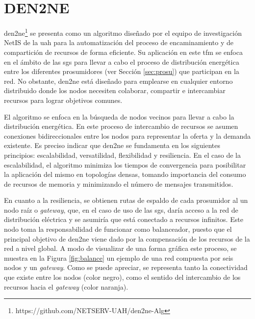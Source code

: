 \section{DEN2NE}
\label{sec:den2ne}

\acrfull{den2ne}\footnote{https://github.com/NETSERV-UAH/den2ne-Alg} \cite{den2ne} \cite{gitden2ne} se presenta como un algoritmo diseñado por el equipo de investigación NetIS de la \gls{uah} para la automatización del proceso de encaminamiento y de compartición de recursos de forma eficiente. Su aplicación en este \gls{tfm} se enfoca en el ámbito de las \gls{sg}s para llevar a cabo el proceso de distribución energética entre los diferentes prosumidores (ver Sección \ref{sec:prosu}) que participan en la red. No obstante, \gls{den2ne} está diseñado para emplearse en cualquier entorno distribuido donde los nodos necesiten colaborar, compartir e intercambiar recursos para lograr objetivos comunes.

\vspace{3mm} 

El algoritmo se enfoca en la búsqueda de nodos vecinos para llevar a cabo la distribución energética. En este proceso de intercambio de recursos se asumen conexiones bidireccionales entre los nodos para representar la oferta y la demanda existente. Es preciso indicar que \gls{den2ne} se fundamenta en los siguientes principios: escalabilidad, versatilidad, flexibilidad y resiliencia. En el caso de la escalabilidad, el algoritmo minimiza los tiempos de convergencia para posibilitar la aplicación del mismo en topologías densas, tomando importancia del consumo de recursos de memoria y minimizando el número de mensajes transmitidos. 

\vspace{3mm}

En cuanto a la resiliencia, se obtienen rutas de espaldo de cada prosumidor al un nodo raíz o \textit{gateway}, que, en el caso de uso de las \gls{sg}s, daría acceso a la red de distribución eléctrica y se asumiría que está conectado a recursos infinitos. Este nodo toma la responsabilidad de funcionar como balanceador, puesto que el principal objetivo de \gls{den2ne} viene dado por la compensación de los recursos de la red a nivel global. A modo de visualizar de una forma gráfica este proceso, se muestra en la Figura \ref{fig:balance} un ejemplo de una red compuesta por seis nodos y un \textit{gateway}. Como se puede apreciar, se representa tanto la conectividad que existe entre los nodos (color negro), como el sentido del intercambio de los recursos hacia el \textit{gateway} (color naranja). 

